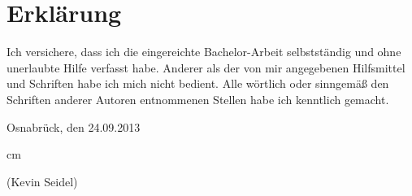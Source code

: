 \documentclass{AGTI}
\begin{document}
\tableofcontents
\listoffigures

\cleardoublepage





%





%
%
%
%

%
%
%
%

%

%


\cleardoublepage

  \vspace*{15cm}

  \chapter*{Erklärung}

  \thispagestyle{empty}

  Ich versichere, dass ich die eingereichte Bachelor-Arbeit selbstständig und ohne
  unerlaubte Hilfe verfasst habe. Anderer als der von mir angegebenen Hilfsmittel und
  Schriften habe ich mich nicht bedient. Alle wörtlich oder sinngemäß den Schriften
  anderer Autoren entnommenen Stellen habe ich kenntlich gemacht.

  \bigskip\bigskip

\begin{flushright}
Osnabrück, den 24.09.2013
\end{flushright}
 cm

 \bigskip
 \bigskip
 \bigskip
 \bigskip
 \bigskip

 (Kevin Seidel)
\end{document}
